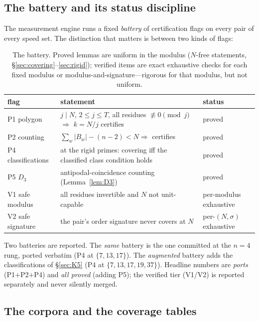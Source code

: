 \documentclass[11pt,a4paper]{article}
\numberwithin{equation}{section}
\theoremstyle{plain}
\theoremstyle{plain}
\theoremstyle{definition}
\theoremstyle{remark}
\begin{document}
\subsection{The battery and its status discipline}

The measurement engine runs a fixed \emph{battery} of certification
flags on every pair of every speed set. The distinction that matters is
between two kinds of flags:

\begin{table}[htbp]
\centering
\small
\caption{The battery. Proved lemmas are uniform in the modulus
($N$-free statements, \S\ref{sec:covering}--\ref{sec:rigid}); verified
items are exact exhaustive checks for each fixed modulus or
modulus-and-signature---rigorous for that modulus, but not uniform.}
\label{tab:battery}
\begin{tabularx}{\textwidth}{l X l}
\toprule
flag & statement & status \\
\midrule
P1 polygon & $j\mid N$, $2\le j\le T$, all residues $\not\equiv0 \pmod j$
  $\Rightarrow$ $k=N/j$ certifies & proved \\
P2 counting & $\sum_w|B_w|-(n-2)<N\Rightarrow$ certifies & proved \\
P4 classifications & at the rigid primes: covering iff the classified
  class condition holds & proved \\
P5 $D_3$ & antipodal-coincidence counting
  (Lemma~\ref{lem:D3}) & proved \\
V1 safe modulus & all residues invertible and $N$ not unit-capable &
  per-modulus exhaustive \\
V2 safe signature & the pair's order signature never covers at $N$ &
  per-$(N,\sigma)$ exhaustive \\
\bottomrule
\end{tabularx}
\end{table}

Two batteries are reported. The \emph{same} battery is the one committed
at the $n=4$ rung, ported verbatim (P4 at $\{7,13,17\}$). The
\emph{augmented} battery adds the classifications of
\S\ref{sec:K5} (P4 at $\{7,13,17,19,37\}$). Headline numbers are
\emph{ports} (P1$+$P2$+$P4) and \emph{all proved} (adding P5); the
verified tier (V1/V2) is reported separately and never silently merged.

\subsection{The corpora and the coverage tables}
\end{document}
